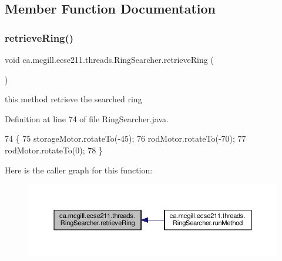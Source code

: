 \subsection{Member Function Documentation}
\mbox{\label{classca_1_1mcgill_1_1ecse211_1_1threads_1_1_ring_searcher_abd7a2651a7c5de76a018664c8bf327af}} 
\subsubsection{\texorpdfstring{retrieve\+Ring()}{retrieveRing()}}
{\footnotesize\ttfamily void ca.\+mcgill.\+ecse211.\+threads.\+Ring\+Searcher.\+retrieve\+Ring (\begin{DoxyParamCaption}{ }\end{DoxyParamCaption})}

this method retrieve the searched ring 

Definition at line 74 of file Ring\+Searcher.\+java.


\begin{DoxyCode}
74                              \{
75     storageMotor.rotateTo(-45);
76     rodMotor.rotateTo(-70);
77     rodMotor.rotateTo(0);
78   \}
\end{DoxyCode}
Here is the caller graph for this function\+:
\nopagebreak
\begin{figure}[H]
\begin{center}
\leavevmode
\includegraphics[width=350pt]{classca_1_1mcgill_1_1ecse211_1_1threads_1_1_ring_searcher_abd7a2651a7c5de76a018664c8bf327af_icgraph}
\end{center}
\end{figure}
\mbox{\label{classca_1_1mcgill_1_1ecse211_1_1threads_1_1_ring_searcher_a2b03c700b5d232f5aef7c6acf439b7ea}} 
